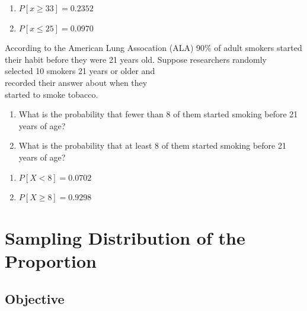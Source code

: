 \documentclass[11pt, chapterprefix=true]{scrbook}\usepackage[]{graphicx}\usepackage[]{color}
\begin{document}
\begin{exercises}
\begin{solution}
\begin{enumerate}
\item $P[ x \ge 33] = 0.2352$
\item $P[ x \le 25] = 0.0970$
\end{enumerate}

\end{solution}

\begin{exercise}   %



According to the American Lung Assocation (ALA) 90\% of adult smokers started their habit before they were 21 years old.    Suppose researchers randomly \\ selected 10 smokers 21 years or older and \\ recorded their answer about when they \\ started to smoke tobacco.

\begin{enumerate}
\item What is the  probability that fewer than 8 of them started smoking before 21 \\ years of age?
\item What is the  probability that at least 8 of them started smoking before 21 years of age?
\end{enumerate}

\end{exercise}
\begin{solution}   %

\begin{enumerate}
\item $P[ X < 8 ] = 0.0702$ 
\item $P[ X \ge 8 ] = 0.9298$ 
\end{enumerate}

\end{solution}

\end{exercises}
 
\onecolumn




\chapter{Sampling Distribution of the Proportion}
\label{chap:ch8}

\section{Objective}
\end{document}
